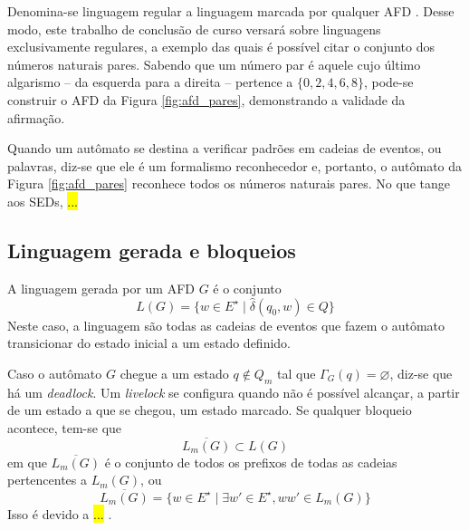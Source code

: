 Denomina-se linguagem regular a linguagem marcada por qualquer AFD \cite{hopcroft}. Desse modo, este trabalho de conclusão de curso versará sobre linguagens exclusivamente regulares, a exemplo das quais é possível citar o conjunto dos números naturais pares. Sabendo que um número par é aquele cujo último algarismo -- da esquerda para a direita -- pertence a $\{ 0, 2, 4, 6, 8 \}$, pode-se construir o AFD da Figura \ref{fig:afd_pares}, demonstrando a validade da afirmação.


Quando um autômato se destina a verificar padrões em cadeias de eventos, ou palavras, diz-se que ele é um formalismo reconhecedor \cite{menezes} e, portanto, o autômato da Figura \ref{fig:afd_pares} reconhece todos os números naturais pares. No que tange aos \acs{SED}s,  \hl{...}

\subsection{Linguagem gerada e bloqueios}

A linguagem gerada por um AFD $G$ é o conjunto $$L(G) = \{ w \in E^\star \mid \hat{\delta}(q_0, w) \in Q \}$$ Neste caso, a linguagem são todas as cadeias de eventos que fazem o autômato transicionar do estado inicial a um estado definido.

Caso o autômato $G$ chegue a um estado $q \not\in Q_m$ tal que $\Gamma_G(q) = \varnothing$, diz-se que há um \textit{deadlock}. Um \textit{livelock} se configura quando não é possível alcançar, a partir de um estado a que se chegou, um estado marcado. Se qualquer bloqueio acontece, tem-se que $$\overline{L_m(G)} \subset L(G)$$ em que $\overline{L_m(G)}$ é o conjunto de todos os prefixos de todas as cadeias pertencentes a $L_m(G)$, ou $$\overline{L_m(G)} = \{ w \in E^\star \mid \exists w' \in E^\star, w w' \in L_m(G) \}$$ Isso é devido a \hl{...} \cite{cassandras}.

